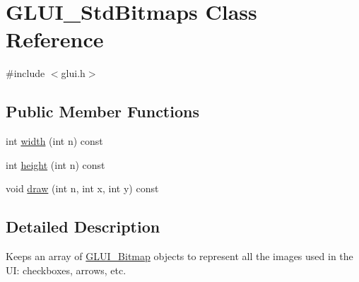 \hypertarget{classGLUI__StdBitmaps}{\section{G\-L\-U\-I\-\_\-\-Std\-Bitmaps Class Reference}
\label{classGLUI__StdBitmaps}
}


{\ttfamily \#include $<$glui.\-h$>$}

\subsection*{Public Member Functions}
\begin{DoxyCompactItemize}
\item 
int \hyperlink{classGLUI__StdBitmaps_ad3a2b8300692f83de6329545f716597f}{width} (int n) const 
\item 
int \hyperlink{classGLUI__StdBitmaps_a300ea4a965d0b80777bcc7e0e7117dd8}{height} (int n) const 
\item 
void \hyperlink{classGLUI__StdBitmaps_ae073d4320cc030a1d0a7032d54334838}{draw} (int n, int x, int y) const 
\end{DoxyCompactItemize}


\subsection{Detailed Description}
Keeps an array of \hyperlink{classGLUI__Bitmap}{G\-L\-U\-I\-\_\-\-Bitmap} objects to represent all the images used in the U\-I\-: checkboxes, arrows, etc. 

